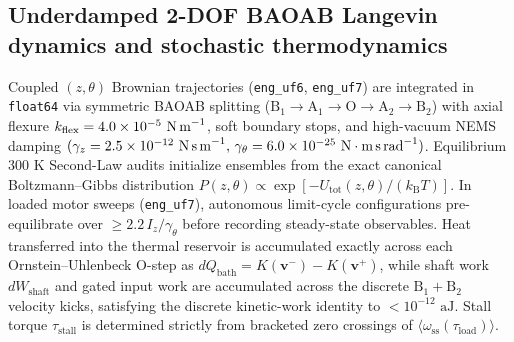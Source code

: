 \documentclass[11pt,a4paper]{article}
\begin{document}
\subsection*{Underdamped 2-DOF BAOAB Langevin dynamics and stochastic thermodynamics}
Coupled $(z,\theta)$ Brownian trajectories (\texttt{eng\_uf6}, \texttt{eng\_uf7}) are integrated in \texttt{float64} via symmetric BAOAB splitting\cite{leimkuhler2013baoab} ($\mathrm{B}_1 \to \mathrm{A}_1 \to \mathrm{O} \to \mathrm{A}_2 \to \mathrm{B}_2$) with axial flexure $k_{\mathrm{flex}} = 4.0\times 10^{-5}\text{ N\,m}^{-1}$, soft boundary stops, and high-vacuum NEMS damping $(\gamma_z = 2.5\times 10^{-12}\text{ N\,s\,m}^{-1},\,\gamma_\theta = 6.0\times 10^{-25}\text{ N}\cdot\text{m\,s\,rad}^{-1})$. Equilibrium $300\text{ K}$ Second-Law audits initialize ensembles from the exact canonical Boltzmann--Gibbs distribution $P(z,\theta) \propto \exp[-U_{\mathrm{tot}}(z,\theta)/(k_{\mathrm{B}}T)]$. In loaded motor sweeps (\texttt{eng\_uf7}), autonomous limit-cycle configurations pre-equilibrate over $\ge 2.2\,I_z/\gamma_\theta$ before recording steady-state observables. Heat transferred into the thermal reservoir is accumulated exactly across each Ornstein--Uhlenbeck $\mathrm{O}$-step as $dQ_{\mathrm{bath}} = K(\mathbf{v}^-) - K(\mathbf{v}^+)$, while shaft work $dW_{\mathrm{shaft}}$ and gated input work are accumulated across the discrete $\mathrm{B}_1+\mathrm{B}_2$ velocity kicks, satisfying the discrete kinetic-work identity to $< 10^{-12}\text{ aJ}$. Stall torque $\tau_{\mathrm{stall}}$ is determined strictly from bracketed zero crossings of $\langle\omega_{\mathrm{ss}}(\tau_{\mathrm{load}})\rangle$.
\end{document}
